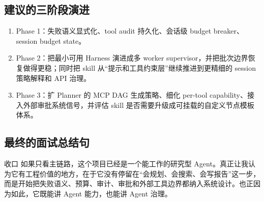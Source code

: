 \documentclass[12pt]{article}
\begin{document}
\subsection{建议的三阶段演进}
\begin{enumerate}[leftmargin=2em]
  \item Phase 1：失败语义显式化、tool audit 持久化、会话级 budget breaker、session budget state。
  \item Phase 2：把最小可用 Harness 演进成多 worker supervisor，并把批次边界恢复做得更稳；同时把 skill 从“提示和工具约束层”继续推进到更精细的 session 策略解释和 API 治理。
  \item Phase 3：扩 Planner 的 MCP DAG 生成策略、细化 per-tool capability、接入外部审批系统信号，并评估 skill 是否需要升级成可挂载的自定义节点模板体系。
\end{enumerate}

\subsection{最终的面试总结句}
\begin{qaBox}{收口}
如果只看主链路，这个项目已经是一个能工作的研究型 Agent。真正让我认为它有工程价值的地方，在于它没有停留在“会规划、会搜索、会写报告”这一步，而是开始把失败语义、预算、审计、审批和外部工具边界都纳入系统设计。也正因为如此，它既能讲 Agent 能力，也能讲 Agent 治理。
\end{qaBox}
\end{document}
